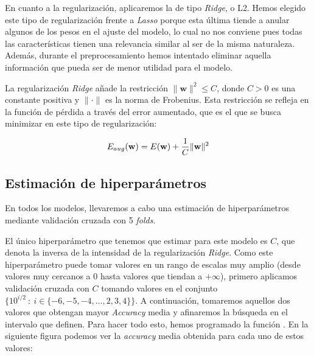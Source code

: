 \documentclass[a4]{article}
\begin{document}
En cuanto a la regularización, aplicaremos la de tipo \textit{Ridge}, o L2. Hemos elegido este tipo de regularización frente a \textit{Lasso} porque esta última tiende a anular algunos de los pesos en el ajuste del modelo, lo cual no nos conviene pues todas las características tienen una relevancia similar al ser de la misma naturaleza. Además, durante el preprocesamiento hemos intentado eliminar aquella información que pueda ser de menor utilidad para el modelo.

La regularización \textit{Ridge} añade la restricción $\|\textbf{w}\|^2 \leq C$, donde $C>0$ es una constante positiva y $\| \cdot \|$ es la norma de Frobenius. Esta restricción se refleja en la función de pérdida a través del error aumentado, que es el que se busca minimizar en este tipo de regularización:

$$E_{aug}(\textbf{w}) = E(\textbf{w}) + \frac{1}{C} \|\textbf{\textbf{w}}\|^2$$


\subsection{Estimación de hiperparámetros}

En todos los modelos, llevaremos a cabo una estimación de hiperparámetros mediante validación cruzada con 5 \textit{folds}.


El único hiperparámetro que tenemos que estimar para este modelo es $C$, que denota la inversa de la intensidad de la regularización \textit{Ridge}. Como este hiperparámetro puede tomar valores en un rango de escalas muy amplio (desde valores muy cercanos a 0 hasta valores que tiendan a $+\infty$), primero aplicamos validación cruzada con $C$ tomando valores en el conjunto $\{10^{i/2} \ : \ i \in \{-6,-5,-4,\dots,2,3,4\} \}$. A continuación, tomaremos aquellos dos valores que obtengan mayor \textit{Accuracy} media y afinaremos la búsqueda en el intervalo que definen. Para hacer todo esto, hemos programado la función . En la siguiente figura podemos ver la \textit{accuracy} media obtenida para cada uno de estos valores:
\end{document}
